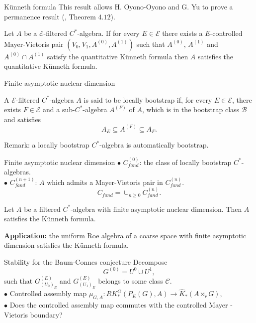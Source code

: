 
\begin{frame}{Künneth formula}
This result allows H. Oyono-Oyono and G. Yu to prove a permanence result (\cite{OY4}, Theorem $4.12$).
\begin{thmfr}
Let $A$ be a $\mathcal E$-filtered $C^*$-algebra. If for every $E\in \mathcal E$ there exists a $E$-controlled Mayer-Vietoris pair $(V_0, V_1, A^{(0)}, A^{(1)})$ such that $A^{(0)}$, $A^{(1)}$ and $A^{(0)} \cap A^{(1)}$ satisfy the quantitative Künneth formula then $A$ satisfies the quantitative Künneth formula.   
\end{thmfr}
\end{frame}

\begin{frame}{Finite asymptotic nuclear dimension}
\begin{definitionfr}
A $\mathcal E$-filtered $C^*$-algebra $A$ is said to be locally bootstrap if, for every $E\in \mathcal E$, there exists $F\in \mathcal E$ and a sub-$C^*$-algebra $A^{(F)}$ of $A$, which is in the bootstrap class $\mathcal B$ and satisfies
\[A_E \subseteq A^{(F)}\subseteq A_F. \]
\end{definitionfr}
Remark: a locally bootstrap $C^*$-algebra is automatically bootstrap.\\
\end{frame}

\begin{frame}{Finite asymptotic nuclear dimension}
$\bullet$ $C_{fand}^{(0)}$: the class of locally bootstrap $C^*$-algebras. \\
$\bullet$ $C^{(n+1)}_{fand}$: $A$ which admits a Mayer-Vietoris pair in $C_{fand}^{(n)}$.\\
\[ C_{fand}  = \cup_{n\geq 0} C_{fand}^{(n)}.\]
 
\begin{thmfr}[\cite{OY4}]
Let $A$ be a filtered $C^*$-algebra with finite asymptotic nuclear dimension. Then $A$ satisfies the Künneth formula.\\ \end{thmfr}

\textbf{Application:} the uniform Roe algebra of a coarse space with finite asymptotic dimension satisfies the Künneth formula.\\
\end{frame}

\begin{frame}{Stability for the Baum-Connes conjecture}
Decompose \[G^{(0)} = U^0 \cup U^1, \]
such that $G_{(U_0)	_E}^{(E)}$ and $G_{(U_1)_E}^{(E)}$ belongs to some class $\mathcal C$.\\
\vspace{0.3in}
$\bullet$ Controlled assembly map $\mu_{G,A}: RK_*^G(P_E(G), A) \rightarrow \hat K_*(A\rtimes_r G)$,\\
\vspace{0.3in}
$\bullet$ Does the controlled assembly map commutes with the controlled Mayer -Vietoris boundary?\\ 

\end{frame}